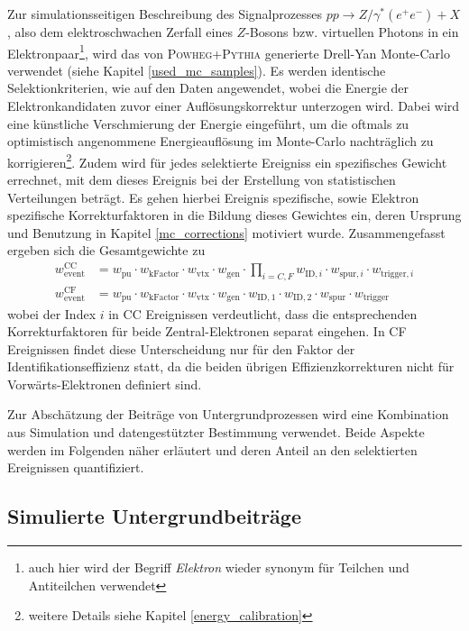 Zur simulationsseitigen Beschreibung des Signalprozesses
$pp \rightarrow Z/\gamma^*(e^+e^-) + X$, also dem elektroschwachen Zerfall
eines $Z$-Bosons bzw. virtuellen Photons in ein Elektronpaar\footnote{auch hier
wird der Begriff \textit{Elektron} wieder synonym für Teilchen und Antiteilchen
verwendet}, wird das von \textsc{Powheg+Pythia} generierte Drell-Yan
Monte-Carlo verwendet (siehe Kapitel \ref{used_mc_samples}). Es werden
identische Selektionkriterien, wie auf den Daten angewendet, wobei die Energie
der Elektronkandidaten zuvor einer Auflösungskorrektur unterzogen wird. Dabei
wird eine künstliche Verschmierung der Energie eingeführt, um die oftmals zu
optimistisch angenommene Energieauflösung im Monte-Carlo nachträglich zu
korrigieren\footnote{weitere Details siehe Kapitel \ref{energy_calibration}}.
Zudem wird für jedes selektierte Ereigniss ein spezifisches Gewicht errechnet,
mit dem dieses Ereignis bei der Erstellung von statistischen Verteilungen
beträgt. Es gehen hierbei Ereignis spezifische, sowie Elektron spezifische
Korrekturfaktoren in die Bildung dieses Gewichtes ein, deren Ursprung und
Benutzung in Kapitel \ref{mc_corrections} motiviert wurde. Zusammengefasst
ergeben sich die Gesamtgewichte zu
\begin{align}
    w_\text{event}^\text{CC} &= w_\text{pu} \cdot w_\text{kFactor} \cdot
        w_\text{vtx} \cdot w_\text{gen} \cdot \prod_{i=C,F} w_{\text{ID},i}
        \cdot w_{\text{spur},i} \cdot w_{\text{trigger},i}
        \\[2pt]
    w_\text{event}^\text{CF} &= w_\text{pu} \cdot w_\text{kFactor} \cdot
        w_\text{vtx} \cdot w_\text{gen} \cdot w_{\text{ID},1} \cdot
        w_{\text{ID},2} \cdot w_{\text{spur}} \cdot w_{\text{trigger}}
\end{align}
wobei der Index $i$ in \ac{CC} Ereignissen verdeutlicht, dass die
entsprechenden Korrekturfaktoren für beide Zentral-Elektronen separat eingehen.
In \ac{CF} Ereignissen findet diese Unterscheidung nur für den Faktor der
Identifikationseffizienz statt, da die beiden übrigen Effizienzkorrekturen
nicht für Vorwärts-Elektronen definiert sind.

Zur Abschätzung der Beiträge von Untergrundprozessen wird eine Kombination aus
Simulation und datengestützter Bestimmung verwendet. Beide Aspekte werden im
Folgenden näher erläutert und deren Anteil an den selektierten Ereignissen
quantifiziert.



\subsection{Simulierte Untergrundbeiträge}
\label{afb:monte_carlos}

